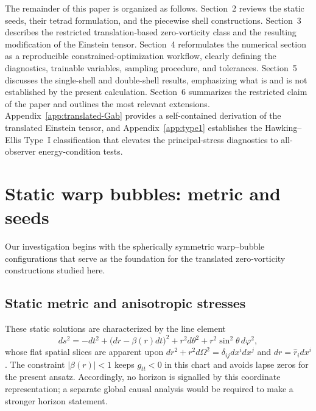 \documentclass[11pt]{article}
\begin{document}
The remainder of this paper is organized as follows. Section~2 reviews the static seeds, their tetrad formulation, and the piecewise shell constructions. Section~3 describes the restricted translation-based zero-vorticity class and the resulting modification of the Einstein tensor. Section~4 reformulates the numerical section as a reproducible constrained-optimization workflow, clearly defining the diagnostics, trainable variables, sampling procedure, and tolerances. Section~5 discusses the single-shell and double-shell results, emphasizing what is and is not established by the present calculation. Section~6 summarizes the restricted claim of the paper and outlines the most relevant extensions. Appendix~\ref{app:translated-Gab} provides a self-contained derivation of the translated Einstein tensor, and Appendix~\ref{app:type1} establishes the Hawking--Ellis Type~I classification that elevates the principal-stress diagnostics to all-observer energy-condition tests.

\section{Static warp bubbles: metric and seeds}
\label{sec:static}
Our investigation begins with the spherically symmetric warp--bubble configurations that serve as the foundation for the translated zero-vorticity constructions studied here.

\subsection{Static metric and anisotropic stresses}
These static solutions are characterized by the line element
\begin{equation}
\label{eq:static-metric}
ds^2 = -dt^2 + \bigl(dr-\beta(r)dt\bigr)^2 + r^2d\theta^2 + r^2\sin^2\theta\, d\varphi^2,
\end{equation}
whose flat spatial slices are apparent upon $dr^2+r^2d\Omega^2=\delta_{ij}dx^idx^j$ and $dr=\hat r_i dx^i$. The constraint $|\beta(r)| < 1$ keeps $g_{tt}<0$ in this chart and avoids lapse zeros for the present ansatz. Accordingly, no horizon is signalled by this coordinate representation; a separate global causal analysis would be required to make a stronger horizon statement.
\end{document}
